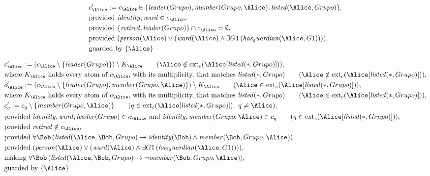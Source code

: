 \begin{align*}
&
c'_
{
\Alice
}
 := 
c_
{
\Alice
}
 \uplus 
\{
\mathit{
leader
}
(
Grupo
)
,
\mathit{
member
}
(
Grupo
,
\Alice
)
,
\mathit{
listed
}
(
\Alice
,
Grupo
)
\}
,\\
&
\text{provided } 
\mathit{
identity
}
,
\mathit{
ward
}
 \in c_
{
\Alice
}
,\\
&
\text{provided } 
\{
\mathit{
retired
}
,
\mathit{
leader
}
(
Grupo
)
\}
 \cap c_
{
\Alice
}
 = \emptyset
,\\
&
\text{provided } 
(
\mathit{
person
}
(
\Alice
)
\lor
(
\mathit{
ward
}
(
\Alice
)
\land
\exists 
G1
\,(
\mathit{
has_guardian
}
(
\Alice
,
G1
)
)
)
)
,\\
&
\text{guarded by } \{
\Alice
\}
\end{align*}

\begin{align*}
&
c'_
{
\Alice
}
 := 
(c_
{
\Alice
}
 \setminus 
\{
\mathit{
leader
}
(
Grupo
)
\}
) \setminus K_
{
\Alice
}
 \qquad (
\Alice
 \notin 
\mathrm{ext}_c(
\Alice
[
\mathit{
listed
}
(
\ast
,
Grupo
)
]
)
)
,\\
&
\text{where } K_
{
\Alice
}
 \text{ holds every atom of } c_
{
\Alice
}
 \text{, with its multiplicity, that matches } 
\mathit{
listed
}
(
\ast
,
Grupo
)
 \qquad (
\Alice
 \notin 
\mathrm{ext}_c(
\Alice
[
\mathit{
listed
}
(
\ast
,
Grupo
)
]
)
)
,\\
&
c'_
{
\Alice
}
 := 
(c_
{
\Alice
}
 \setminus 
\{
\mathit{
leader
}
(
Grupo
)
,
\mathit{
member
}
(
Grupo
,
\Alice
)
\}
) \setminus K_
{
\Alice
}
 \qquad (
\Alice
 \in 
\mathrm{ext}_c(
\Alice
[
\mathit{
listed
}
(
\ast
,
Grupo
)
]
)
)
,\\
&
\text{where } K_
{
\Alice
}
 \text{ holds every atom of } c_
{
\Alice
}
 \text{, with its multiplicity, that matches } 
\mathit{
listed
}
(
\ast
,
Grupo
)
 \qquad (
\Alice
 \in 
\mathrm{ext}_c(
\Alice
[
\mathit{
listed
}
(
\ast
,
Grupo
)
]
)
)
,\\
&
c'_
q
 := 
c_
q
 \setminus 
\{
\mathit{
member
}
(
Grupo
,
\Alice
)
\}
 \qquad (
q
 \in 
\mathrm{ext}_c(
\Alice
[
\mathit{
listed
}
(
\ast
,
Grupo
)
]
)
,\ 
q \neq 
\Alice
)
,\\
&
\text{provided } 
\mathit{
identity
}
,
\mathit{
ward
}
,
\mathit{
leader
}
(
Grupo
)
 \in c_
{
\Alice
}
 \text{ and } 
\mathit{
identity
}
,
\mathit{
member
}
(
Grupo
,
\Alice
)
 \in c_
q
 \qquad (
q \in 
\mathrm{ext}_c(
\Alice
[
\mathit{
listed
}
(
\ast
,
Grupo
)
]
)
)
,\\
&
\text{provided } 
\mathit{
retired
}
 \notin c_
{
\Alice
}
,\\
&
\text{provided } 
\forall 
\Bob
\,(
\mathit{
listed
}
(
\Alice
,
\Bob
,
Grupo
)
\rightarrow
\mathit{
identity
}
(
\Bob
)
\land
\mathit{
member
}
(
\Bob
,
Grupo
,
\Alice
)
)
,\\
&
\text{provided } 
(
\mathit{
person
}
(
\Alice
)
\lor
(
\mathit{
ward
}
(
\Alice
)
\land
\exists 
G1
\,(
\mathit{
has_guardian
}
(
\Alice
,
G1
)
)
)
)
,\\
&
\text{making } 
\forall 
\Bob
\,(
\mathit{
listed
}
(
\Alice
,
\Bob
,
Grupo
)
\rightarrow
\neg 
\mathit{
member
}
(
\Bob
,
Grupo
,
\Alice
)
)
,\\
&
\text{guarded by } \{
\Alice
\}
\end{align*}
